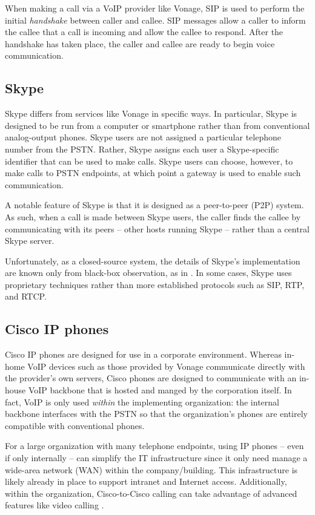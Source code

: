 \documentclass[11pt]{article}
\newcommand{\term}[1]{\textit{#1}}
\begin{document}
When making a call via a VoIP provider like Vonage, SIP is used to perform the
initial \term{handshake} between caller and callee. SIP messages allow a caller
to inform the callee that a call is incoming and allow the callee to respond.
After the handshake has taken place, the caller and callee are ready to begin
voice communication. \cite{rtp_voip}

\subsection{Skype}

Skype differs from services like Vonage in specific ways. In particular, Skype
is designed to be run from a computer or smartphone rather than from
conventional analog-output phones. Skype users are not assigned a particular
telephone number from the PSTN.  Rather, Skype assigns each user a
Skype-specific identifier that can be used to make calls. Skype users can
choose, however, to make calls to PSTN endpoints, at which point a gateway is
used to enable such communication.  \cite{skype_pstn,skype_gateways}

A notable feature of Skype is that it is designed as a peer-to-peer (P2P)
system. As such, when a call is made between Skype users, the caller finds the
callee by communicating with its peers -- other hosts running Skype -- rather
than a central Skype server. \cite{skype}

Unfortunately, as a closed-source system, the details of Skype's implementation
are known only from black-box observation, as in \cite{skype}. In some cases,
Skype uses proprietary techniques rather than more established protocols such as
SIP, RTP, and RTCP.

\subsection{Cisco IP phones}

Cisco IP phones are designed for use in a corporate environment. Whereas in-home
VoIP devices such as those provided by Vonage communicate directly with the
provider's own servers, Cisco phones are designed to communicate with an
in-house VoIP backbone that is hosted and manged by the corporation itself. In
fact, VoIP is only used \emph{within} the implementing organization: the
internal backbone interfaces with the PSTN so that the organization's phones are
entirely compatible with conventional phones. \cite{cisco_design}

For a large organization with many telephone endpoints, using IP phones -- even
if only internally -- can simplify the IT infrastructure since it only need
manage a wide-area network (WAN) within the company/building. This
infrastructure is likely already in place to support intranet and Internet
access. Additionally, within the organization, Cisco-to-Cisco calling can take
advantage of advanced features like video calling \cite{tmcnet}.
\end{document}
